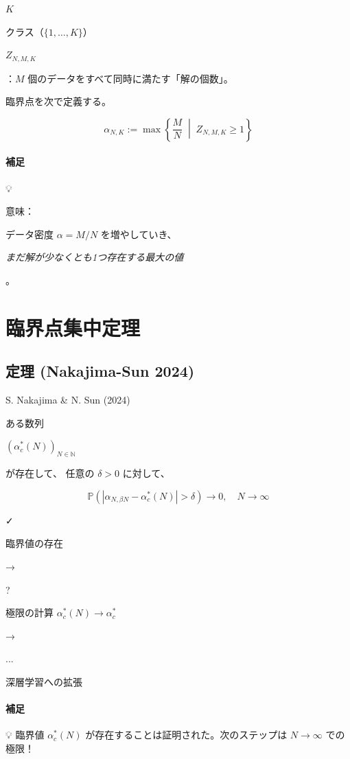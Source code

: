 \documentclass[uplatex,dvipdfmx,11pt,a4paper,openany]{bxjsbook}
\begin{document}
\(K\)

クラス（\(\{1,\dots,K\}\)）

\allowbreak{}

\(Z_{N,M,K}\)

：\(M\) 個のデータをすべて同時に満たす「解の個数」。

\allowbreak{}

臨界点を次で定義する。

\[
                \alpha_{N,K} := \max\left\{ \frac{M}{N} \;\middle|\; Z_{N,M,K} \ge 1 \right\}
                \]

\paragraph{補足}
💡

意味：

データ密度 \(\alpha = M/N\) を増やしていき、

\emph{まだ解が少なくとも1つ存在する最大の値}

。

\allowbreak{}


\section{臨界点集中定理}
\subsection{定理 (Nakajima-Sun 2024)}
S. Nakajima \& N. Sun (2024)

ある数列

\( (\alpha_c^*(N))_{N\in \mathbb{N}} \)

が存在して、 任意の \( \delta > 0 \) に対して、

\[ \mathbb{P}\left( \left| \alpha_{N,\beta N} - \alpha_c^*(N) \right| > \delta \right) \to 0, \quad N\to \infty\]

✓

臨界値の存在

→

?

極限の計算\allowbreak{} \( \alpha_c^*(N) \to \alpha_c^* \)

→

...

深層学習への拡張

\paragraph{補足}
💡 臨界値 \( \alpha_c^*(N) \) が存在することは証明された。次のステップは \( N \to \infty \) での極限！
\end{document}
